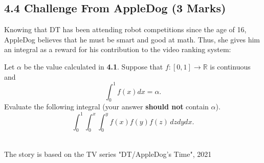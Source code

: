 \documentclass[12pt]{article}
\renewcommand{\emph}[1]{{\color{Turquoise3}\textsl{#1}}}
\begin{document}
\subsection*{4.4 Challenge From AppleDog (3 Marks)}
\par Knowing that DT has been attending robot competitions since the age of 16, AppleDog believes that he must be smart and good at math. Thus, she gives him an integral as a reward for his contribution to the video ranking system: 

Let \emph{$\alpha$} be the value calculated in \textbf{4.1}. Suppose that $f:[0,1] \to \mathbb{R}$ is continuous and 
\begin{equation*}
    \int_0^1 f(x) dx = \alpha. 
\end{equation*}
Evaluate the following integral (your answer \textbf{should not} contain \emph{$\alpha$}). 
\begin{equation*}
    \int_0^1 \int_0^x \int_0^y f(x)f(y)f(z)\,dzdydx. 
\end{equation*} 
~\\ 

\begin{flushright}
    The story is based on the TV series "DT/AppleDog's Time", 2021
\end{flushright}
\end{document}
